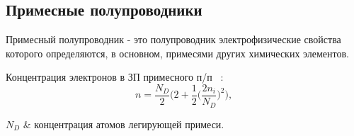 \subsection{Примесные полупроводники}
Примесный полупроводник - это полупроводник электрофизические свойства которого определяются, в основном, примесями других химических элементов.

Концентрация электронов в ЗП примесного п/п ~\cite{MFTIne}:
\begin{equation}
	n = \frac{N_{D}}{2}\bigg( 2 + \frac{1}{2}\bigg( \frac{2n_{i}}{N_{D}} \bigg)^{2} \bigg),
\end{equation}
\begin{conditions}
	$N_{D}$ & концентрация атомов легирующей примеси.
\end{conditions}